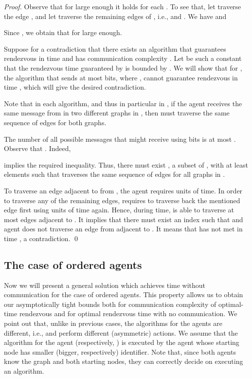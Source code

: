 \documentclass{llncs}
\begin{document}
\begin{proof}
Observe that for  large enough it holds  for each .
To see that, let  traverse the edge , and let  traverse the remaining edges of , i.e.,  and .
We have  and

Since , we obtain that  for  large enough.

Suppose for a contradiction that there exists an algorithm  that guarantees rendezvous in time  and has communication complexity .
Let  be such a constant that the rendezvous time guaranteed by  is bounded by .
We will show that for , the algorithm  that sends at most  bits, where , cannot guarantee rendezvous in time , which will give the desired contradiction.

Note that in each algorithm, and thus in particular in , if the agent  receives the same message from  in two different graphs in , then  must traverse the same sequence of edges for both graphs.

The number of all possible messages that  might receive using  bits is at most .
Observe that . Indeed, 
 
implies the required inequality.
Thus, there must exist , a subset of , with at least  elements such that  traverses the same sequence of edges for all graphs in . 

To traverse an edge adjacent to  from , the agent  requires  units of time.
In order to traverse any of the remaining edges,  requires to traverse back the mentioned edge first using  units of time again.
Hence, during  time,  is able to traverse at most  edges adjacent to . 
It implies that there must exist an index  such that  and agent  does not traverse an edge from  adjacent to . 
It means that  has not met  in time , a contradiction.   
\qed\end{proof}


\subsection{The case of ordered agents}
Now we will present a general solution which achieves  time without communication for the case of ordered agents.
This property allows us to obtain our asymptotically tight bounds both for communication complexity of optimal-time rendezvous and for optimal rendezvous time with no communication.
We point out that, unlike in previous cases, the algorithms for the agents are different, i.e.,  and  perform different (asymmetric) actions.
We assume that the algorithm for the agent  (respectively, ) is executed by the agent whose starting node has smaller (bigger, respectively) identifier.
Note that, since both agents know the graph and both starting nodes, they can correctly decide on executing an algorithm.
\end{document}
